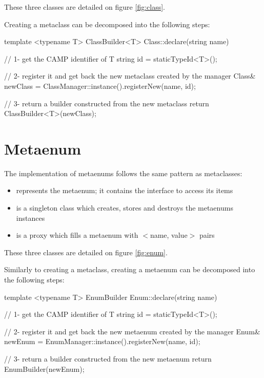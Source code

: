\documentclass[a4paper, twoside]{report}
\begin{document}
	These three classes are detailed on figure \ref{fig:class}.
	
	Creating a metaclass can be decomposed into the following steps:
	
\begin{cppcode}
template <typename T>
ClassBuilder<T> Class::declare(string name)
{
  // 1- get the CAMP identifier of T
  string id = staticTypeId<T>();
  
  // 2- register it and get back the new metaclass created by the manager
  Class& newClass = ClassManager::instance().registerNew(name, id);
  
  // 3- return a builder constructed from the new metaclass
  return ClassBuilder<T>(newClass);
}
\end{cppcode}


\chapter{Metaenum}

	The implementation of metaenums follows the same pattern as metaclasses:
	
	\begin{itemize}
		\item \verb@Enum@ represents the metaenum; it contains the interface to access its items
		\item \verb@EnumManager@ is a singleton class which creates, stores and destroys the metaenums instances
		\item \verb@EnumBuilder@ is a proxy which fills a metaenum with $<$name, value$>$ pairs
	\end{itemize}
	
	These three classes are detailed on figure \ref{fig:enum}.
	
	Similarly to creating a metaclass, creating a metaenum can be decomposed into the following steps:
	
\begin{cppcode}
template <typename T>
EnumBuilder Enum::declare(string name)
{
  // 1- get the CAMP identifier of T
  string id = staticTypeId<T>();
  
  // 2- register it and get back the new metaenum created by the manager
  Enum& newEnum = EnumManager::instance().registerNew(name, id);
  
  // 3- return a builder constructed from the new metaenum
  return EnumBuilder(newEnum);
}
\end{cppcode}
\end{document}
